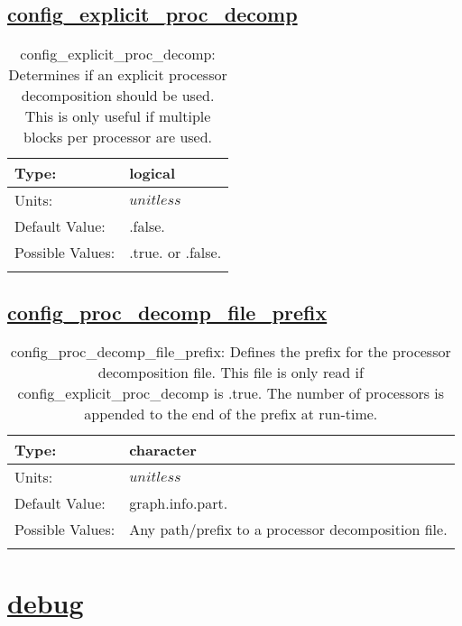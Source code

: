 \subsection[config\_explicit\_proc\_decomp]{\hyperref[sec:nm_tab_decomposition]{config\_explicit\_proc\_decomp}}
\label{subsec:nm_sec_config_explicit_proc_decomp}
\begin{center}
\begin{longtable}{| p{2.0in} | p{4.0in} |}
    \hline
    Type: & logical \\
    \hline
    Units: & $unitless$ \\
    \hline
    Default Value: & .false. \\
    \hline
    Possible Values: & .true. or .false. \\
    \hline
    \caption{config\_explicit\_proc\_decomp: Determines if an explicit processor decomposition should be used. This is only useful if multiple blocks per processor are used.}
\end{longtable}
\end{center}
\subsection[config\_proc\_decomp\_file\_prefix]{\hyperref[sec:nm_tab_decomposition]{config\_proc\_decomp\_file\_prefix}}
\label{subsec:nm_sec_config_proc_decomp_file_prefix}
\begin{center}
\begin{longtable}{| p{2.0in} | p{4.0in} |}
    \hline
    Type: & character \\
    \hline
    Units: & $unitless$ \\
    \hline
    Default Value: & graph.info.part. \\
    \hline
    Possible Values: & Any path/prefix to a processor decomposition file. \\
    \hline
    \caption{config\_proc\_decomp\_file\_prefix: Defines the prefix for the processor decomposition file. This file is only read if config\_explicit\_proc\_decomp is .true. The number of processors is appended to the end of the prefix at run-time.}
\end{longtable}
\end{center}
\section[debug]{\hyperref[sec:nm_tab_debug]{debug}}
\label{sec:nm_sec_debug}
